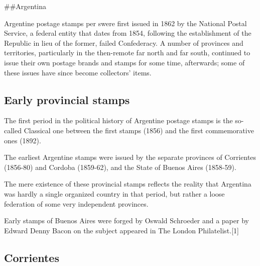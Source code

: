 
\#\#Argentina

Argentine postage stamps per s\e were first issued in 1862 by the National Postal Service, a federal entity that dates from 1854, following the establishment of the Republic in lieu of the former, failed Confederacy. A number of provinces and territories, particularly in the then-remote far north and far south, continued to issue their own postage brands and stamps for some time, afterwards; some of these issues have since become collectors' items.

 
\subsection{Early provincial stamps}

The first period in the political history of Argentine postage stamps is the so-called Classical one between the first stamps (1856) and the first commemorative ones (1892). 

The earliest Argentine stamps were issued by the separate provinces of Corrientes (1856-80) and Cordoba (1859-62), and the State of Buenos Aires (1858-59). 

The mere existence of these provincial stamps reflects the reality that Argentina was hardly a single organized country in that period, but rather a loose federation of some very independent provinces. 

Early stamps of Buenos Aires were forged by Oswald Schroeder and a paper by Edward Denny Bacon on the subject appeared in The London Philatelist.[1]





\subsection{Corrientes}

